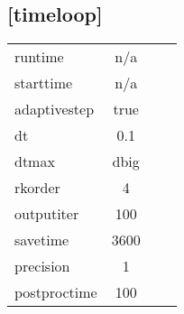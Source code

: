 \documentclass[a4paper,10pt]{extarticle}
\begin{document}
\subsection*{[timeloop]}
\tablelasttail{\hline}
\begin{supertabular}{lcll}
runtime       & n/a   & \\
starttime     & n/a   & \\
adaptivestep  & true  & \\
dt            & 0.1   & \\
dtmax         & dbig  & \\
rkorder       & 4     & \\
outputiter    & 100   & \\
savetime      & 3600  & \\
precision     & 1     & \\
postproctime  & 100   & \\
\end{supertabular}
\end{document}
